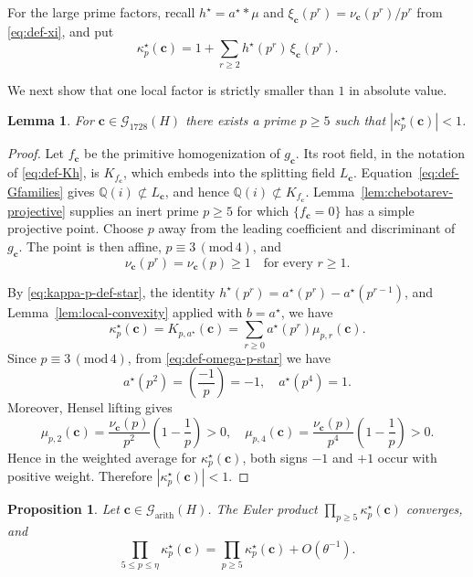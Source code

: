 \documentclass[12pt,reqno]{amsart}
\numberwithin{equation}{section}
\newtheorem{lemma}[theorem]{Lemma}
\newtheorem{proposition}[theorem]{Proposition}
\theoremstyle{definition}
\renewcommand{\le}{\leqslant}
\renewcommand{\ge}{\geqslant}
\newcommand{\QQ}{\mathbb{Q}}
\newcommand{\cc}{\mathbf{c}}
\renewcommand{\pmod}[1]{\,(\mathrm{mod}\,#1)}
\begin{document}
For the large prime factors, recall $h^\star=a^\star*\mu$ and $\xi_\cc(p^r)=\nu_\cc(p^r)/p^r$ from \eqref{eq:def-xi}, and put
\begin{equation}\label{eq:kappa-p-def-star}
\kappa_p^\star(\cc)=1+\sum_{r\ge 2}h^\star(p^r)\,\xi_\cc(p^r).
\end{equation}

We next show that one local factor is strictly smaller than $1$ in absolute value.

\begin{lemma}\label{lem:kappa-strict-star}
For $\cc\in \mathcal G_{1728}(H)$ there exists a prime $p\ge 5$ such that $|\kappa_p^\star(\cc)|<1$.
\end{lemma}

\begin{proof}
Let $f_\cc$ be the primitive homogenization of $g_\cc$.
Its root field, in the notation of \eqref{eq:def-Kh}, is $K_{f_\cc}$, which embeds into the splitting field $L_\cc$.
Equation~\eqref{eq:def-Gfamilies} gives $\QQ(i)\not\subset L_\cc$, and hence $\QQ(i)\not\subset K_{f_\cc}$.
Lemma~\ref{lem:chebotarev-projective} supplies an inert prime $p\ge5$ for which $\{f_\cc=0\}$ has a simple projective point.
Choose $p$ away from the leading coefficient and discriminant of $g_\cc$.
The point is then affine, $p\equiv3\pmod4$, and
\[
\nu_\cc(p^r)=\nu_\cc(p)\ge1\quad\text{for every }r\ge1.
\]

By \eqref{eq:kappa-p-def-star}, the identity
$h^\star(p^r)=a^\star(p^r)-a^\star(p^{r-1})$, and
Lemma~\ref{lem:local-convexity} applied with $b=a^\star$, we have
\[
\kappa_p^\star(\cc)
=K_{p,a^\star}(\cc)
=\sum_{r\ge 0}a^\star(p^r)\mu_{p,r}(\cc).
\]
Since $p\equiv 3\pmod 4$, from \eqref{eq:def-omega-p-star} we have
\[
a^\star(p^2)=\left(\frac{-1}{p}\right)=-1,\quad
a^\star(p^4)=1.
\]
Moreover, Hensel lifting gives
\[
\mu_{p,2}(\cc)=\frac{\nu_\cc(p)}{p^2}\left(1-\frac1p\right)>0,\quad
\mu_{p,4}(\cc)=\frac{\nu_\cc(p)}{p^4}\left(1-\frac1p\right)>0.
\]
Hence in the weighted average for $\kappa_p^\star(\cc)$, both signs $-1$ and $+1$ occur with positive weight.
Therefore $|\kappa_p^\star(\cc)|<1$.
\end{proof}

\begin{proposition}\label{prop:kappa-tail-star}
Let $\cc\in \mathcal G_{\mathrm{arith}}(H)$.
The Euler product $\prod_{p\ge 5}\kappa_p^\star(\cc)$ converges, and
\[
\prod_{5\le p\le \eta}\kappa_p^\star(\cc)
=\prod_{p\ge 5}\kappa_p^\star(\cc)+O(\theta^{-1}).
\]
\end{proposition}
\end{document}
